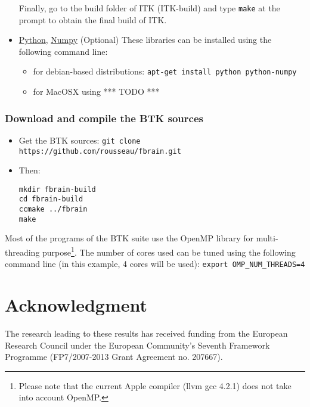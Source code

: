 \documentclass[a4paper,10pt]{article}
\begin{document}
\begin{itemize}
Finally, go to the build folder of ITK (ITK-build) and type \texttt{make} at the prompt to obtain the final build of ITK.
 \item \href{http://www.python.org/}{Python}, \href{http://numpy.scipy.org/}{Numpy} (Optional)
 These libraries can be installed using the following command line:
 \begin{itemize}
     \item for debian-based distributions: \texttt{apt-get install python python-numpy}
     \item for MacOSX using *** TODO ***
 \end{itemize}
\end{itemize}

\subsubsection{Download and compile the BTK sources}
\begin{itemize}
 \item Get the BTK sources: \texttt{git clone https://github.com/rousseau/fbrain.git }
 \item Then:
\begin{verbatim}
mkdir fbrain-build
cd fbrain-build
ccmake ../fbrain
make
\end{verbatim}
\end{itemize}

Most of the programs of the BTK suite use the OpenMP library for multi-threading
purpose\footnote{Please note that the current Apple compiler (llvm gcc 4.2.1) does not take into account OpenMP.}. The number of cores used can be tuned using the following command line
(in this example, 4 cores will be used): \texttt{export OMP\_NUM\_THREADS=4}




\section*{Acknowledgment}
\small{The research leading to these results has received funding from the
European Research Council under the European Community’s Seventh Framework
Programme (FP7/2007-2013 Grant Agreement no. 207667).}



\end{document}
